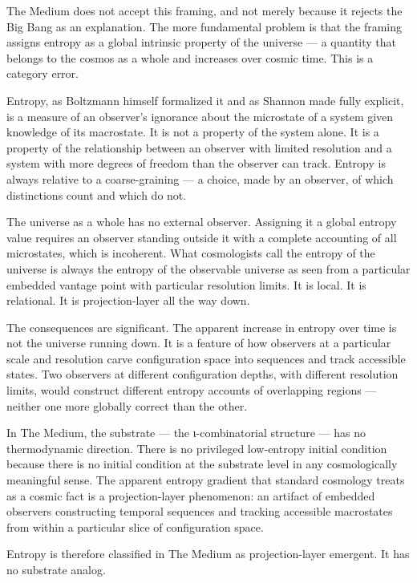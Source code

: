 \documentclass[11pt,letterpaper]{article}
\begin{document}
The Medium does not accept this framing, and not merely because it rejects the Big Bang as an explanation. The more fundamental problem is that the framing assigns entropy as a global intrinsic property of the universe — a quantity that belongs to the cosmos as a whole and increases over cosmic time. This is a category error.

Entropy, as Boltzmann himself formalized it and as Shannon made fully explicit, is a measure of an observer's ignorance about the microstate of a system given knowledge of its macrostate. It is not a property of the system alone. It is a property of the relationship between an observer with limited resolution and a system with more degrees of freedom than the observer can track. Entropy is always relative to a coarse-graining — a choice, made by an observer, of which distinctions count and which do not.

The universe as a whole has no external observer. Assigning it a global entropy value requires an observer standing outside it with a complete accounting of all microstates, which is incoherent. What cosmologists call the entropy of the universe is always the entropy of the observable universe as seen from a particular embedded vantage point with particular resolution limits. It is local. It is relational. It is projection-layer all the way down.

The consequences are significant. The apparent increase in entropy over time is not the universe running down. It is a feature of how observers at a particular scale and resolution carve configuration space into sequences and track accessible states. Two observers at different configuration depths, with different resolution limits, would construct different entropy accounts of overlapping regions — neither one more globally correct than the other.

In The Medium, the substrate — the ι-combinatorial structure — has no thermodynamic direction. There is no privileged low-entropy initial condition because there is no initial condition at the substrate level in any cosmologically meaningful sense. The apparent entropy gradient that standard cosmology treats as a cosmic fact is a projection-layer phenomenon: an artifact of embedded observers constructing temporal sequences and tracking accessible macrostates from within a particular slice of configuration space.

Entropy is therefore classified in The Medium as projection-layer emergent. It has no substrate analog.
\end{document}
